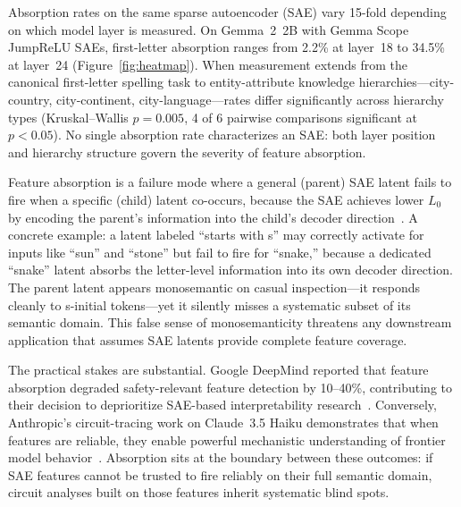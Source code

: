 \documentclass{article}
\begin{document}
Absorption rates on the same sparse autoencoder (SAE) vary 15-fold depending on which model layer is measured. On Gemma~2~2B with Gemma Scope JumpReLU SAEs, first-letter absorption ranges from 2.2\% at layer~18 to 34.5\% at layer~24 (Figure~\ref{fig:heatmap}). When measurement extends from the canonical first-letter spelling task to entity-attribute knowledge hierarchies---city-country, city-continent, city-language---rates differ significantly across hierarchy types (Kruskal--Wallis $p = 0.005$, 4 of 6 pairwise comparisons significant at $p < 0.05$). No single absorption rate characterizes an SAE: both layer position and hierarchy structure govern the severity of feature absorption.

Feature absorption is a failure mode where a general (parent) SAE latent fails to fire when a specific (child) latent co-occurs, because the SAE achieves lower $L_0$ by encoding the parent's information into the child's decoder direction~\citep{chanin2024absorption}. A concrete example: a latent labeled ``starts with s'' may correctly activate for inputs like ``sun'' and ``stone'' but fail to fire for ``snake,'' because a dedicated ``snake'' latent absorbs the letter-level information into its own decoder direction. The parent latent appears monosemantic on casual inspection---it responds cleanly to s-initial tokens---yet it silently misses a systematic subset of its semantic domain. This false sense of monosemanticity threatens any downstream application that assumes SAE latents provide complete feature coverage.

The practical stakes are substantial. Google DeepMind reported that feature absorption degraded safety-relevant feature detection by 10--40\%, contributing to their decision to deprioritize SAE-based interpretability research~\citep{lieberum2024gemma}. Conversely, Anthropic's circuit-tracing work on Claude~3.5 Haiku demonstrates that when features are reliable, they enable powerful mechanistic understanding of frontier model behavior~\citep{lindsey2025circuit}. Absorption sits at the boundary between these outcomes: if SAE features cannot be trusted to fire reliably on their full semantic domain, circuit analyses built on those features inherit systematic blind spots.
\end{document}
